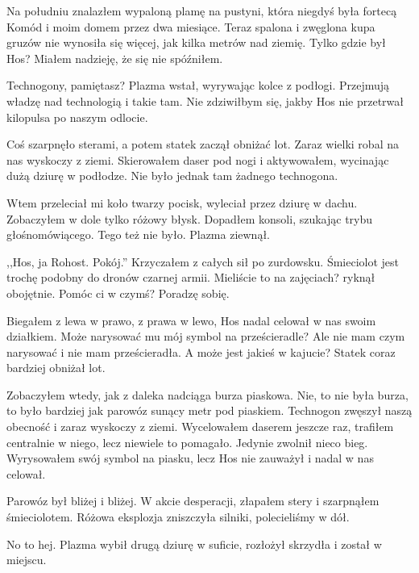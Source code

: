 Na południu znalazłem wypaloną plamę na pustyni, która niegdyś była fortecą Komód i moim domem przez dwa miesiące.
Teraz spalona i zwęglona kupa gruzów nie wynosiła się więcej, jak kilka metrów nad ziemię.
Tylko gdzie był Hos? Miałem nadzieję, że się nie spóźniłem.

\begin{dialogue}
\ds{} Technogony, pamiętasz? \dm{} Plazma wstał, wyrywając kolce z podłogi. \dm{} 
Przejmują władzę nad technologią i takie tam. Nie zdziwiłbym się, jakby Hos nie przetrwał kilopulsa po naszym odlocie.
\end{dialogue}
Coś szarpnęło sterami, a potem statek zaczął obniżać lot.
Zaraz wielki robal na nas wyskoczy z ziemi.
Skierowałem daser pod nogi i aktywowałem, wycinając dużą dziurę w podłodze.
Nie było jednak tam żadnego technogona.

Wtem przeleciał mi koło twarzy pocisk, wyleciał przez dziurę w dachu. 
Zobaczyłem w dole tylko różowy błysk.
Dopadłem konsoli, szukając trybu głośnomówiącego.
Tego też nie było.
Plazma ziewnął.

\begin{dialogue}
\ds{} ,,Hos, ja Rohost. Pokój.'' \dm{} Krzyczałem z całych sił po zurdowsku.
\ds{} Śmieciolot jest trochę podobny do dronów czarnej armii. Mieliście to na zajęciach? \dm{} ryknął obojętnie. \dm{} Pomóc ci w czymś?
\ds{} Poradzę sobię.
\end{dialogue}

Biegałem z lewa w prawo, z prawa w lewo, Hos nadal celował w nas swoim działkiem.
Może narysować mu mój symbol na prześcieradle? Ale nie mam czym narysować i nie mam prześcieradła.
A może jest jakieś w kajucie?
Statek coraz bardziej obniżał lot.

Zobaczyłem wtedy, jak z daleka nadciąga burza piaskowa.
Nie, to nie była burza, to było bardziej jak parowóz sunący metr pod piaskiem.
Technogon zwęszył naszą obecność i zaraz wyskoczy z ziemi.
Wycelowałem daserem jeszcze raz, trafiłem centralnie w niego, lecz niewiele to pomagało. Jedynie zwolnił nieco bieg.
Wyrysowałem swój symbol na piasku, lecz Hos nie zauważył i nadal w nas celował.

Parowóz był bliżej i bliżej.
W akcie desperacji, złapałem stery i szarpnąłem śmieciolotem.
Różowa eksplozja zniszczyła silniki, polecieliśmy w dół.
\begin{dialogue}
\ds{} No to hej. \dm{} Plazma wybił drugą dziurę w suficie, rozłożył skrzydła i został w miejscu.
\end{dialogue}

